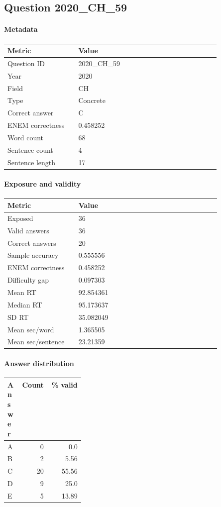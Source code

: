\subsection*{Question 2020\_CH\_59}
\label{sec:q_2020_CH_59}
\paragraph{Metadata}
\begin{tabular}{p{0.30\linewidth}p{0.60\linewidth}}
\toprule
Metric & Value\\
\midrule
Question ID & 2020\_CH\_59\\
Year & 2020\\
Field & CH\\
Type & Concrete\\
Correct answer & C\\
ENEM correctness & 0.458252\\
Word count & 68\\
Sentence count & 4\\
Sentence length & 17\\
\bottomrule
\end{tabular}

\paragraph{Exposure and validity}
\begin{tabular}{p{0.30\linewidth}p{0.60\linewidth}}
\toprule
Metric & Value\\
\midrule
Exposed & 36\\
Valid answers & 36\\
Correct answers & 20\\
Sample accuracy & 0.555556\\
ENEM correctness & 0.458252\\
Difficulty gap & 0.097303\\
Mean RT & 92.854361\\
Median RT & 95.173637\\
SD RT & 35.082049\\
Mean sec/word & 1.365505\\
Mean sec/sentence & 23.21359\\
\bottomrule
\end{tabular}

\paragraph{Answer distribution}
\begin{tabular}{p{0.18\linewidth}rr}
\toprule
Answer & Count & \% valid\\
\midrule
A & 0 & 0.0\\
B & 2 & 5.56\\
C & 20 & 55.56\\
D & 9 & 25.0\\
E & 5 & 13.89\\
\bottomrule
\end{tabular}

